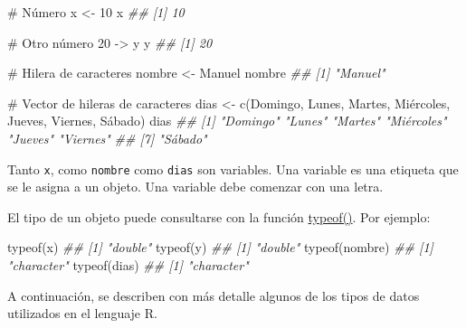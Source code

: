 \documentclass[
  letterpaper,
  DIV=11,
  numbers=noendperiod]{scrreprt}
\newenvironment{Shaded}{\begin{snugshade}}{\end{snugshade}}
\newcommand{\CommentTok}[1]{\textcolor[rgb]{0.37,0.37,0.37}{#1}}
\newcommand{\DecValTok}[1]{\textcolor[rgb]{0.68,0.00,0.00}{#1}}
\newcommand{\DocumentationTok}[1]{\textcolor[rgb]{0.37,0.37,0.37}{\textit{#1}}}
\newcommand{\FunctionTok}[1]{\textcolor[rgb]{0.28,0.35,0.67}{#1}}
\newcommand{\NormalTok}[1]{\textcolor[rgb]{0.00,0.23,0.31}{#1}}
\newcommand{\OtherTok}[1]{\textcolor[rgb]{0.00,0.23,0.31}{#1}}
\newcommand{\StringTok}[1]{\textcolor[rgb]{0.13,0.47,0.30}{#1}}
\begin{document}
\begin{Shaded}
\begin{Highlighting}[]
\CommentTok{\# Número}
\NormalTok{x }\OtherTok{\textless{}{-}} \DecValTok{10}
\NormalTok{x}
\DocumentationTok{\#\# [1] 10}

\CommentTok{\# Otro número}
\DecValTok{20} \OtherTok{{-}\textgreater{}}\NormalTok{ y}
\NormalTok{y}
\DocumentationTok{\#\# [1] 20}

\CommentTok{\# Hilera de caracteres}
\NormalTok{nombre }\OtherTok{\textless{}{-}} \StringTok{\textquotesingle{}Manuel\textquotesingle{}}
\NormalTok{nombre}
\DocumentationTok{\#\# [1] "Manuel"}

\CommentTok{\# Vector de hileras de caracteres}
\NormalTok{dias }\OtherTok{\textless{}{-}} \FunctionTok{c}\NormalTok{(}\StringTok{\textquotesingle{}Domingo\textquotesingle{}}\NormalTok{, }\StringTok{\textquotesingle{}Lunes\textquotesingle{}}\NormalTok{, }\StringTok{\textquotesingle{}Martes\textquotesingle{}}\NormalTok{, }\StringTok{\textquotesingle{}Miércoles\textquotesingle{}}\NormalTok{, }\StringTok{\textquotesingle{}Jueves\textquotesingle{}}\NormalTok{, }\StringTok{\textquotesingle{}Viernes\textquotesingle{}}\NormalTok{, }\StringTok{\textquotesingle{}Sábado\textquotesingle{}}\NormalTok{)}
\NormalTok{dias}
\DocumentationTok{\#\# [1] "Domingo"   "Lunes"     "Martes"    "Miércoles" "Jueves"    "Viernes"  }
\DocumentationTok{\#\# [7] "Sábado"}
\end{Highlighting}
\end{Shaded}

Tanto \texttt{x}, como \texttt{nombre} como \texttt{dias} son variables.
Una variable es una etiqueta que se le asigna a un objeto. Una variable
debe comenzar con una letra.

El tipo de un objeto puede consultarse con la función
\href{https://rdrr.io/r/base/typeof.html}{typeof()}. Por ejemplo:

\begin{Shaded}
\begin{Highlighting}[]
\FunctionTok{typeof}\NormalTok{(x)}
\DocumentationTok{\#\# [1] "double"}
\FunctionTok{typeof}\NormalTok{(y)}
\DocumentationTok{\#\# [1] "double"}
\FunctionTok{typeof}\NormalTok{(nombre)}
\DocumentationTok{\#\# [1] "character"}
\FunctionTok{typeof}\NormalTok{(dias)}
\DocumentationTok{\#\# [1] "character"}
\end{Highlighting}
\end{Shaded}

A continuación, se describen con más detalle algunos de los tipos de
datos utilizados en el lenguaje R.
\end{document}
